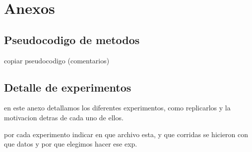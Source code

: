\section{Anexos}
\subsection{Pseudocodigo de metodos}
copiar pseudocodigo (comentarios)

\subsection{Detalle de experimentos}

en este anexo detallamos los diferentes experimentos, como replicarlos y la
motivacion detras de cada uno de ellos.

por cada experimento indicar en que archivo esta, y que corridas se hicieron
con que datos y por que elegimos hacer ese exp.